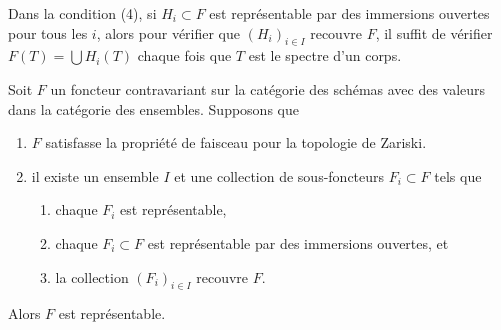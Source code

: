 \noindent
Dans la condition (4), si  $H_i \subset F$  est représentable par des immersions
ouvertes pour tous les  $i$, alors pour vérifier que  $(H_i)_{i \in I}$  recouvre
 $F$, il suffit de vérifier  $F(T) = \bigcup H_i(T)$  chaque fois que  $T$  est
le spectre d'un corps.

\begin{lemma}
\label{lemma-glue-functors}
Soit  $F$  un foncteur contravariant sur la catégorie des schémas avec des
valeurs dans la catégorie des ensembles. Supposons que
\begin{enumerate}
\item $F$  satisfasse la propriété de faisceau pour la topologie de Zariski.
\item il existe un ensemble  $I$  et une collection de sous-foncteurs
 $F_i \subset F$  tels que
\begin{enumerate}
\item chaque  $F_i$  est représentable,
\item chaque  $F_i \subset F$  est représentable par des immersions ouvertes, et
\item la collection  $(F_i)_{i \in I}$  recouvre  $F$.
\end{enumerate}
\end{enumerate}
Alors  $F$  est représentable.
\end{lemma}

